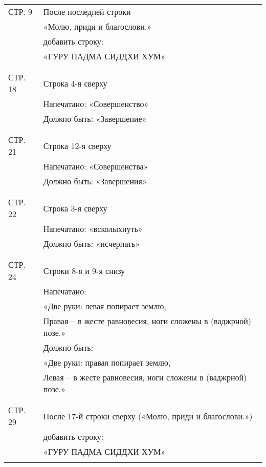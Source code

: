 \documentclass[4pt,oneside]{article}
\begin{document}
\begin{tabular}{ll}

СТР. 9  & После последней строки\\
        & «Молю, приди и благослови.»\\
        & добавить строку:\\
        & «ГУРУ ПАДМА СИДДХИ ХУМ»\\
        \\
        \\
СТР. 18 & Строка 4-я сверху\\
        & Напечатано: «Совершенство»\\
        & Должно быть: «Завершение»\\
        \\
        \\
СТР. 21 & Строка 12-я сверху\\
        & Напечатано: «Совершенства»\\
        & Должно быть: «Завершения»\\
        \\
        \\
СТР. 22 & Строка 3-я сверху\\
        &  Напечатано: «всколыхнуть»\\
        &  Должно быть: «исчерпать»\\
        \\
        \\
СТР. 24 & Строки  8-я и 9-я снизу\\
        & Напечатано:\\
        & «Две руки: левая попирает землю,\\
        & Правая – в жесте равновесия, ноги сложены в (ваджрной) позе.»\\
        & Должно быть:\\
        & «Две руки: правая попирает землю,\\
        & Левая – в жесте равновесия, ноги сложены в (ваджрной) позе.»\\
        \\
        \\
СТР. 29 & После 17-й строки сверху («Молю, приди и благослови.»)\\
        & добавить строку:\\
        & «ГУРУ ПАДМА СИДДХИ ХУМ»\\
        \\
\end{tabular}
\end{document}
